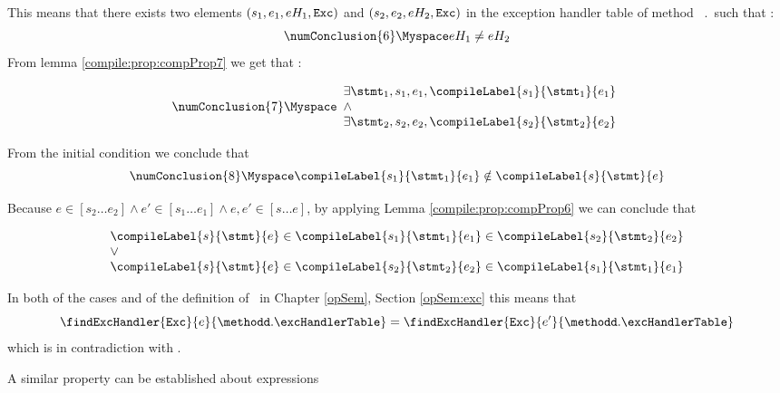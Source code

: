 This means that there exists two elements $   (s_1,e_1, eH_1, \mbox{\rm\texttt{Exc}} ) $  and
$   (s_2,e_2, eH_2, \mbox{\rm\texttt{Exc}} )$  in the exception handler table of method \methodd \ \methodd.\excHandlerTable \  such that   : 
$$ \numConclusion{6}  \Myspace eH_1 \neq eH_2 $$
From lemma \ref{compile:prop:compProp7} we get that :

$$ \numConclusion{7}  \Myspace \begin{array}{l}
        \exists \stmt_1, s_1, e_1, \compileLabel{s_1}{\stmt_1}{e_1} \\
	\wedge \\
	\exists \stmt_2, s_2, e_2,\compileLabel{s_2}{\stmt_2}{e_2}
\end{array}	 $$


From the initial condition  we conclude that 
$$\numConclusion{8} \Myspace \compileLabel{s_1}{\stmt_1}{e_1} \notin   \compileLabel{s}{\stmt}{e} $$


 Because $e \in [s_2 \ldots e_2 ]  \wedge  e' \in [s_1 \ldots e_1 ] \wedge e,e' \in [s \ldots e]$,  by applying 
  Lemma \ref{compile:prop:compProp6}  we can conclude that

 $$  \begin{array}{l} 
          \compileLabel{s}{\stmt}{e} \in \compileLabel{s_1}{\stmt_1}{e_1} \in  \compileLabel{s_2}{\stmt_2}{e_2} \\
           \vee \\
	 \compileLabel{s}{\stmt}{e} \in   \compileLabel{s_2}{\stmt_2}{e_2} \in \compileLabel{s_1}{\stmt_1}{e_1}
 \end{array}$$	   

 In both of the cases and of the definition of \findExcHandlerOnly \ in Chapter \ref{opSem}, Section \ref{opSem:exc}  this means that 
$$ \findExcHandler{\mbox{\rm\tt{Exc}} }{e}{\methodd.\excHandlerTable} = \findExcHandler{\mbox{\rm\tt{Exc}} }{e'}{\methodd.\excHandlerTable} $$
which is in contradiction with .


A similar property can be established about expressions
 
